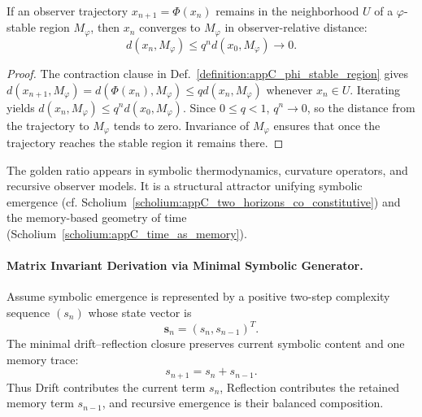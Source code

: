 \begin{lemma}
\label{lemma:appC_geodesic_convergence}
If an observer trajectory $x_{n+1}=\Phi(x_n)$ remains in the neighborhood $U$ of a
$\varphi$-stable region $M_\varphi$, then $x_n$ converges to $M_\varphi$ in
observer-relative distance:
\[
 d(x_n,M_\varphi)\le q^n d(x_0,M_\varphi)\longrightarrow0 .
\]
\end{lemma}

\begin{proof}
\label{proof:appC_geodesic_convergence}
The contraction clause in Def.~\ref{definition:appC_phi_stable_region} gives
$d(x_{n+1},M_\varphi)=d(\Phi(x_n),M_\varphi)\le qd(x_n,M_\varphi)$ whenever
$x_n\in U$. Iterating yields
$d(x_n,M_\varphi)\le q^n d(x_0,M_\varphi)$. Since $0\le q<1$, $q^n\to0$, so the
distance from the trajectory to $M_\varphi$ tends to zero. Invariance of
$M_\varphi$ ensures that once the trajectory reaches the stable region it remains
there.
\end{proof}

\begin{scholium}
\label{scholium:appC_symbolic_geometric_equivalence}
The golden ratio appears in symbolic thermodynamics, curvature operators, and recursive observer models. It is a structural attractor unifying symbolic emergence (cf. Scholium~\ref{scholium:appC_two_horizons_co_constitutive}) and the memory-based geometry of time (Scholium~\ref{scholium:appC_time_as_memory}).
\end{scholium}

\paragraph{Matrix Invariant Derivation via Minimal Symbolic Generator.}
\label{paragraph:appC_matrix_invariant_derivation_phi}

\begin{definition}
\label{definition:appC_symbolic_operator_assumptions}
Assume symbolic emergence is represented by a positive two-step complexity
sequence $(s_n)$ whose state vector is
\[
\mathbf{s}_n=(s_n,s_{n-1})^T.
\]
The minimal drift--reflection closure preserves current symbolic content and one
memory trace:
\[
s_{n+1}=s_n+s_{n-1}.
\]
Thus Drift contributes the current term $s_n$, Reflection contributes the retained
memory term $s_{n-1}$, and recursive emergence is their balanced composition.
\end{definition}

